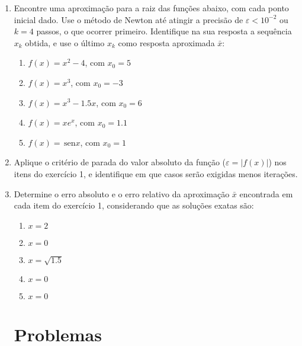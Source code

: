 \documentclass[a4paper]{article}
\providecommand{\sin}{} \renewcommand{\sin}{\hspace{2pt}\mathrm{sen}}
\begin{document}
\begin{enumerate}
\item Encontre uma aproximação para a raiz das funções abaixo, com
  cada ponto inicial dado. Use o método de Newton até atingir a
  precisão de $\varepsilon<10^{-2}$ ou $k=4$ passos, o que ocorrer
  primeiro. Identifique na sua resposta a sequência $x_k$ obtida, e
  use o último $x_k$ como resposta aproximada $\bar{x}$:

  \begin{enumerate}
  \item $f(x) = x^2 - 4$, com $x_0 = 5$
  \item $f(x) = x^3$, com $x_0 = -3$
  \item $f(x) = x^3-1.5x$, com $x_0 = 6$
  \item $f(x) = x e^x$, com $x_0 = 1.1$
  \item $f(x) = \sin x$, com $x_0 = 1$
  \end{enumerate}

\item Aplique o critério de parada do valor absoluto da função
  ($\varepsilon=|f(x)|$) nos itens do exercício 1, e identifique em
  que casos serão exigidas menos iterações.

\item Determine o erro absoluto e o erro relativo da aproximação
  $\bar{x}$ encontrada em cada item do exercício 1, considerando que
  as soluções exatas são:
  \begin{enumerate}
  \item $x=2$ %
  \item $x=0$ %
  \item $x=\sqrt{1.5}$ %
  \item $x=0$ %
  \item $x=0$ %
  \end{enumerate}

\section{Problemas}


\end{enumerate}
\end{document}
